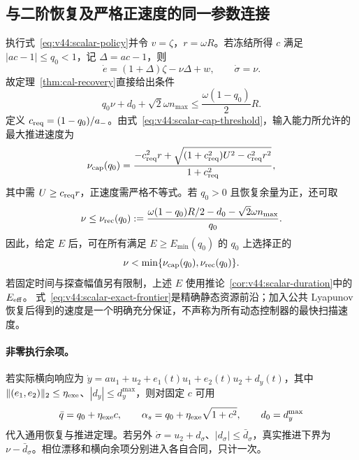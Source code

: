 \documentclass[11pt,a4paper]{article}
\numberwithin{equation}{section}
\theoremstyle{definition}
\begin{document}
\subsection{与二阶恢复及严格正速度的同一参数连接}
执行式~\eqref{eq:v44:scalar-policy}并令 $v=\zeta$，$r=\omega R$。若冻结所得 $c$ 满足 $|ac-1|\le q_0<1$，记 $\Delta=ac-1$，则
\[
 \dot e=(1+\Delta)\zeta-\nu\Delta+w,
 \qquad \dot\sigma=\nu.
\]
故定理~\ref{thm:cal-recovery}直接给出条件
\begin{equation}
 q_0\nu+d_0+\sqrt2\omega n_{\max}
 \le \frac{\omega(1-q_0)}2R.
 \label{eq:v44:scalar-progress-recovery}
\end{equation}
定义 $c_{\rm req}=(1-q_0)/a_-$。由式~\eqref{eq:v44:scalar-cap-threshold}，输入能力所允许的最大推进速度为
\begin{equation}
 \nu_{\rm cap}(q_0)
 =\frac{-c_{\rm req}^2r+
 \sqrt{(1+c_{\rm req}^2)U^2-c_{\rm req}^2r^2}}
 {1+c_{\rm req}^2},
 \label{eq:v44:scalar-cap-speed}
\end{equation}
其中需 $U\ge c_{\rm req}r$，正速度需严格不等式。若 $q_0>0$ 且恢复余量为正，还可取
\[
 \nu\le\nu_{\rm rec}(q_0)
 :=\frac{\omega(1-q_0)R/2-d_0-\sqrt2\omega n_{\max}}{q_0}.
\]
因此，给定 $E$ 后，可在所有满足 $E\ge E_{\min}(q_0)$ 的 $q_0$ 上选择正的
\[
 \nu<\min\{\nu_{\rm cap}(q_0),\nu_{\rm rec}(q_0)\}.
\]
若固定时间与探查幅值另有限制，上述 $E$ 使用推论~\ref{cor:v44:scalar-duration}中的 $E_{\rm eff}$。
式~\eqref{eq:v44:scalar-exact-frontier}是精确静态资源前沿；加入公共 Lyapunov 恢复后得到的速度是一个明确充分保证，不声称为所有动态控制器的最快扫描速度。

\paragraph{非零执行余项。}
若实际横向响应为 $\dot y=a u_1+u_2+e_1(t)u_1+e_2(t)u_2+d_y(t)$，其中 $\|(e_1,e_2)\|_2\le\eta_{\rm exe}$、$|d_y|\le d_y^{\max}$，则对固定 $c$ 可用
\[
 \bar q=q_0+\eta_{\rm exe}c,\qquad
 \alpha_s=q_0+\eta_{\rm exe}\sqrt{1+c^2},\qquad
 d_0=d_y^{\max}
\]
代入通用恢复与推进定理。若另外 $\dot\sigma=u_2+d_\sigma$、$|d_\sigma|\le\bar d_\sigma$，真实推进下界为 $\nu-\bar d_\sigma$。相位漂移和横向余项分别进入各自合同，只计一次。


\end{document}
